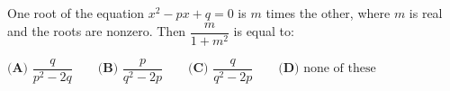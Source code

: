 One root of the equation $x^2-px+q=0$ is $m$ times the other, where $m$ is real and the roots are nonzero. Then $\dfrac{m}{1+m^2}$ is equal to:

$\textbf{(A) }\dfrac{q}{p^2-2q}\qquad\textbf{(B) }\dfrac{p}{q^2-2p}\qquad\textbf{(C) }\dfrac{q}{q^2-2p}\qquad\textbf{(D) }\text{none of these}$
